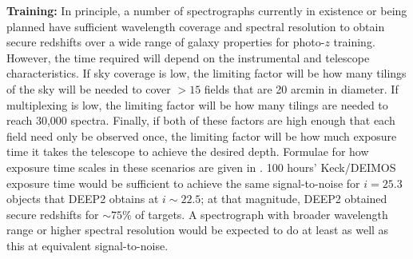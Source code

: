{\bf Training:} In principle, a number of spectrographs currently in existence or being planned have sufficient wavelength coverage and spectral resolution to obtain secure redshifts over a wide range of galaxy properties for photo-$z$ training.  However, the time required will depend on the instrumental and telescope characteristics.  If sky coverage is low, the limiting factor will be how many tilings of the sky will be needed to cover $>15$ fields that are 20 arcmin in diameter.  If multiplexing is low, the limiting factor will be how many tilings are needed to reach 30,000 spectra.  Finally, if both of these factors are high enough that each field need only be observed once, the limiting factor will be how much exposure time it takes the telescope to achieve the desired depth.  Formulae for how exposure time scales in these scenarios are given in \citet{Newman15}.
%
%
%
%
%
100 hours' Keck/DEIMOS exposure time would be sufficient to achieve the same signal-to-noise for $i=25.3$ objects that DEEP2 obtains at $i \sim 22.5$; at that magnitude, DEEP2 obtained secure redshifts for $\sim 75\%$ of targets.  A spectrograph with broader wavelength range or higher spectral resolution would be expected to do at least as well as this at equivalent signal-to-noise.

